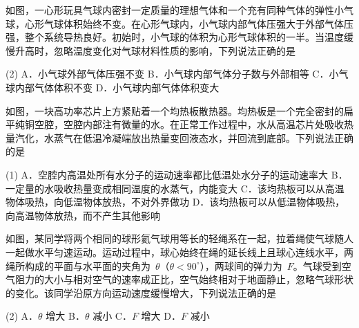 \begin{question}
如图，一心形玩具气球内密封一定质量的理想气体和一个充有同种气体的弹性小气球，心形气球体积始终不变。在心形气球内，小气球内部气体压强大于外部气体压强，整个系统导热良好。初始时，小气球的体积为心形气球体积的一半。当温度缓慢升高时，忽略温度变化对气球材料性质的影响，下列说法正确的是\gkblank


\begin{gkopts}(2)
  \task A．小气球外部气体压强不变
  \task B．小气球内部气体分子数与外部相等
  \task C．小气球内部气体体积不变
  \task D．小气球内部气体体积变大
\end{gkopts}
\end{question}

\begin{question}
如图，一块高功率芯片上方紧贴着一个均热板散热器。均热板是一个完全密封的扁平纯铜空腔，空腔内部注有微量的水。在正常工作过程中，水从高温芯片处吸收热量汽化，水蒸气在低温冷凝端放出热量变回液态水，并回流到底部。下列说法正确的是\gkblank


\begin{gkopts}(1)
  \task A．空腔内高温处所有水分子的运动速率都比低温处水分子的运动速率大
  \task B．一定量的水吸收热量变成相同温度的水蒸气，内能变大
  \task C．该均热板可以从高温物体吸热，向低温物体放热，不对外界做功
  \task D．该均热板可以从低温物体吸热，向高温物体放热，而不产生其他影响
\end{gkopts}
\end{question}

\begin{question}
如图，某同学将两个相同的球形氦气球用等长的轻绳系在一起，拉着绳使气球随人一起做水平匀速运动。运动过程中，球心始终在绳的延长线上且球心连线水平，两绳所构成的平面与水平面的夹角为~$\theta$（$\theta<90^{\circ}$），两球间的弹力为~$F$。气球受到空气阻力的大小与相对空气的速率成正比，空气始终相对于地面静止，忽略气球形状的变化。该同学沿原方向运动速度缓慢增大，下列说法正确的是\gkblank


\begin{gkopts}(2)
  \task A．$\theta$ 增大
  \task B．$\theta$ 减小
  \task C．$F$ 增大
  \task D．$F$ 减小
\end{gkopts}
\end{question}

